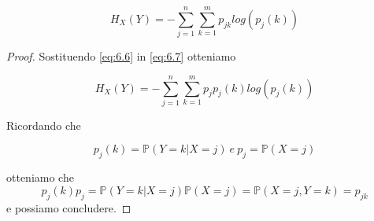 \begin{lem} \label{lemma:6.8}
\begin{equation} \label{eq:6.8}
H_X(Y)=-\sum_{j=1}^n\sum_{k=1}^m p_{jk}log(p_j(k))
\end{equation}
\end{lem}
\begin{proof}
Sostituendo \ref{eq:6.6} in \ref{eq:6.7} otteniamo

\begin{equation} \label{eq:6.8.1}
H_X(Y)=-\sum_{j=1}^n\sum_{k=1}^m p_{j}p_j(k)log(p_j(k))
\end{equation}

Ricordando che 

$$p_j(k)=\mathbb{P}(Y=k|X=j)\ e \ p_j=\mathbb{P}(X=j)$$

otteniamo che 
$$p_j(k)p_j=\mathbb{P}(Y=k|X=j)\mathbb{P}(X=j)=\mathbb{P}(X=j,Y=k)=p_{jk}$$
e possiamo concludere.
\end{proof}


